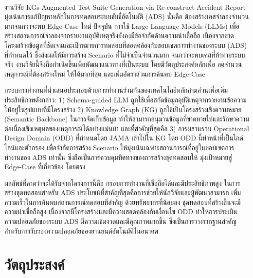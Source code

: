 \paragraph{}งานวิจัย KGs-Augmented Test Suite Generation via Re-construct Accident Report มุ่งเน้นการแก้ปัญหาหลักในการทดสอบระบบขับขี่อัตโนมัติ (ADS) นั่นคือ ต้องสร้างเคสจำลองจำนวนมากจนกว่าจะพบ Edge-Case ใหม่ ปัจจุบัน การใช้ Large Language Models (LLMs) เพื่อสร้างสถานการณ์จำลองจากรายงานอุบัติเหตุจริงยังคงมีข้อจำกัดด้านความน่าเชื่อถือ เนื่องจากขาดโครงสร้างข้อมูลที่ชัดเจนและเป้าหมายการทดสอบที่สอดคล้องกับขอบเขตการทำงานของระบบ (ADS) ที่กำหนดไว้ ซึ่งส่งผลให้มีการสร้าง Scenario ที่ไม่จำเป็นจำนวนมาก จนกว่าจะพบเคสที่ท้าทายระบบจริง งานวิจัยนี้จึงถือกำเนิดขึ้นเพื่อพัฒนาแนวทางที่เป็นระบบ โดยมีวัตถุประสงค์หลักเพื่อ ลดจำนวนเหตุการณ์ที่ต้องสร้างใหม่ ให้ได้มากที่สุด และเพิ่มอัตราส่วนการค้นพบ Edge-Case

กรอบการทำงานที่นำเสนอประกอบด้วยการทำงานร่วมกันของเทคโนโลยีหลักสามส่วนเพื่อเพิ่มประสิทธิภาพดังกล่าว: 1) Schema-guided LLM ถูกใช้เพื่อสกัดข้อมูลอุบัติเหตุจากรายงานข้อความให้อยู่ในรูปแบบที่มีโครงสร้าง 2) Knowledge Graph (KG) ถูกใช้เป็นโครงสร้างเชิงความหมาย (Semantic Backbone) ในการจัดเก็บข้อมูล ทำให้สามารถอนุมานข้อมูลที่ขาดหายไปและรักษาความต่อเนื่องเชิงเหตุผลของเหตุการณ์ได้อย่างแม่นยำ และที่สำคัญที่สุดคือ 3) การผสานรวม Operational Design Domain (ODD) ที่กำหนดโดย JAMA เข้าไปใน KG โดย ODD นี้ทำหน้าที่เป็นไกด์ไลน์และตัวกรอง เพื่อจำกัดการสร้าง Scenario ให้มุ่งเน้นเฉพาะสถานการณ์ที่อยู่ในขอบเขตการทำงานของ ADS เท่านั้น ซึ่งถือเป็นการควบคุมทิศทางของการสร้างชุดทดสอบให้ มุ่งเป้าหมายสู่ Edge-Case ที่เกี่ยวข้อง โดยตรง

ผลลัพธ์ที่คาดว่าจะได้รับจากโครงการนี้คือ กรอบการทำงานที่เชื่อถือได้และมีประสิทธิภาพสูง ในการสร้างชุดทดสอบสำหรับ ADS ประโยชน์ที่สำคัญที่สุดคือการช่วยให้นักวิจัยและผู้พัฒนาสามารถ เพิ่มความเร็วในการค้นพบสถานการณ์ทดสอบที่สำคัญ ด้วยทรัพยากรที่น้อยลง ชุดทดสอบที่สร้างขึ้นจะมีความน่าเชื่อถือสูง เนื่องจากมีโครงสร้างและมีความสอดคล้องกับเงื่อนไข ODD ทำให้การประเมินความปลอดภัยของระบบ ADS มีความเข้มงวดและมีคุณภาพมากขึ้น ซึ่งเป็นการวางรากฐานสำคัญสำหรับการรับรองความปลอดภัยของยานยนต์อัตโนมัติในอนาคต

\section{วัตถุประสงค์}\label{sec:objectives}

